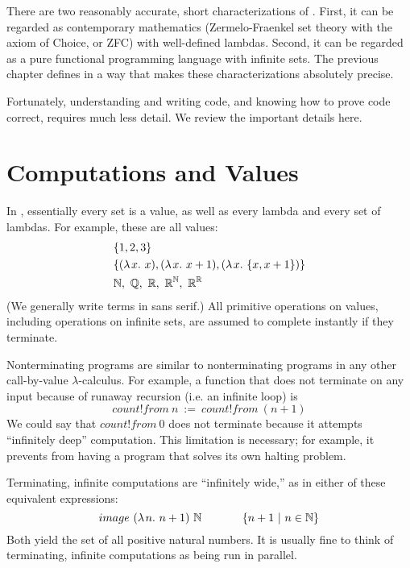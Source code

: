 There are two reasonably accurate, short characterizations of \lzfclang.
First, it can be regarded as contemporary mathematics (Zermelo-Fraenkel set theory with the axiom of Choice, or ZFC) with well-defined lambdas.
Second, it can be regarded as a pure functional programming language with infinite sets.
The previous chapter defines \lzfclang in a way that makes these characterizations absolutely precise.

Fortunately, understanding and writing \lzfclang code, and knowing how to prove \lzfclang code correct, requires much less detail.
We review the important details here.

\section{Computations and Values}

In \lzfclang, essentially every set is a value, as well as every lambda and every set of lambdas.
For example, these are all \lzfclang values:
\begin{equation}
\begin{aligned}
	&\{{1,2,3}\} \\
	&\{{(\lambda\mspace{2mu}{x}\ldotp\, x), (\lambda\mspace{2mu}{x}\ldotp\, x+1), (\lambda\mspace{2mu}{x}\ldotp\,\{{x,x+1}\})}\} \\
	&\mathbb{N},\ \mathbb{Q},\ \mathbb{R},\ \mathbb{R}^{\mathbb{N}},\ \mathbb{R}^{\mathbb{R}}
\end{aligned}
\end{equation}
(We generally write \lzfclang terms in \textsf{sans serif}.)
All primitive operations on values, including operations on infinite sets, are assumed to complete instantly if they terminate.

Nonterminating \lzfclang programs are similar to nonterminating programs in any other call-by-value $\lambda$-calculus.
For example, a function that does not terminate on any input because of runaway recursion (i.e. an infinite loop) is
\begin{equation}
	count!from~n\ :=\ count!from~(n+1)
\end{equation}
We could say that $count!from~0$ does not terminate because it attempts ``infinitely deep'' computation.
This limitation is necessary; for example, it prevents \lzfclang from having a program that solves its own halting problem.

Terminating, infinite computations are ``infinitely wide,'' as in either of these equivalent expressions:
\begin{equation}
	image~(\lambda\mspace{2mu}{n}\ldotp\, n+1)~\mathbb{N} \hspace{0.5in} \lbrace {n+1} \ \lvert\ {n \in \mathbb{N}} \rbrace
\end{equation}
Both yield the set of all positive natural numbers.
It is usually fine to think of terminating, infinite computations as being run in parallel.

